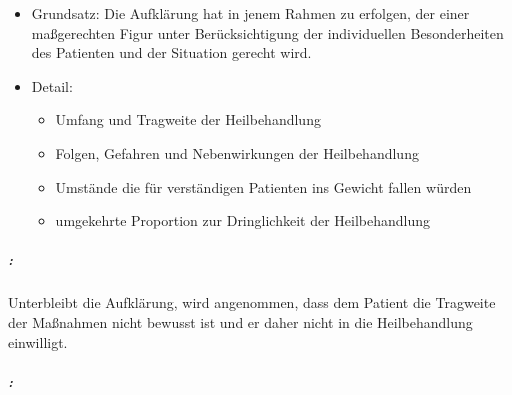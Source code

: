 \begin{itemize}
    \item 	Grundsatz: Die Aufklärung hat in jenem Rahmen zu erfolgen, der einer
       ma{\ss}gerechten Figur unter Ber\"ucksichtigung der individuellen
       Besonderheiten des Patienten und der Situation gerecht
       wird.
       
       \item Detail:
       
       
       \begin{itemize}
           
           \item Umfang und Tragweite der  Heilbehandlung
           \item Folgen, Gefahren und Nebenwirkungen der
           Heilbehandlung
           \item Umstände die f\"ur verständigen Patienten ins
           Gewicht fallen w\"urden
           
           \item umgekehrte Proportion zur Dringlichkeit der
           Heilbehandlung
           
       \end{itemize}
\end{itemize}

\subparagraph*{:}
Unterbleibt die Aufklärung, wird angenommen, dass dem
Patient die Tragweite der Ma{\ss}nahmen nicht bewusst ist und er daher nicht in die
Heilbehandlung einwilligt.

\subparagraph*{:}

